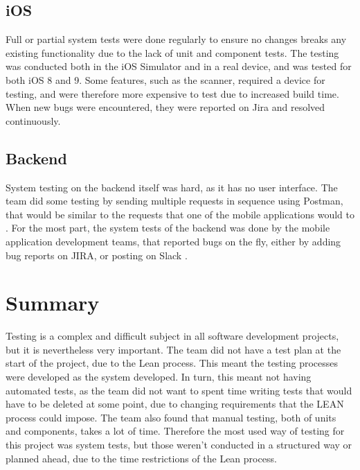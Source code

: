 \subsection{iOS}
Full or partial system tests were done regularly to ensure no changes breaks any existing functionality due to the lack of unit and component tests. The testing was conducted both in the iOS Simulator and in a real device, and was tested for both iOS 8 and 9. Some features, such as the scanner, required a device for testing, and were therefore more expensive to test due to increased build time. When new bugs were encountered, they were reported on Jira and resolved continuously. \cite{jira} 

\subsection{Backend}
System testing on the \gls{backend} itself was hard, as it has no user interface. The team did some testing by sending multiple requests in sequence using Postman, that would be similar to the requests that one of the mobile applications would to \cite{postman}. For the most part, the system tests of the \gls{backend} was done by the mobile application development teams, that reported bugs on the fly, either by adding bug reports on JIRA, or posting on Slack \cite{jira}\cite{slack}.

\section{Summary}
Testing is a complex and difficult subject in all software development projects, but it is nevertheless very important. The team did not have a test plan at the start of the project, due to the Lean process. This meant the testing processes were developed as the system developed. In turn, this meant not having automated tests, as the team did not want to spent time writing tests that would have to be deleted at some point, due to changing requirements that the LEAN process could impose. The team also found that manual testing, both of units and components, takes a lot of time. Therefore the most used way of testing for this project was system tests, but those weren't conducted in a structured way or planned ahead, due to the time restrictions of the Lean process. 